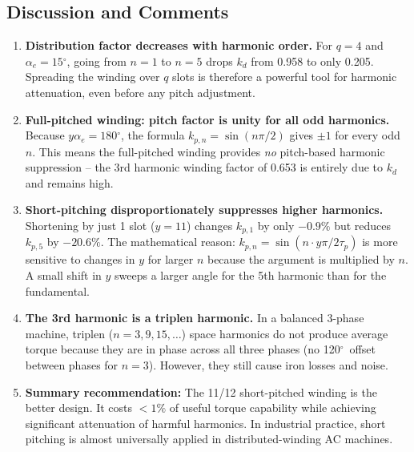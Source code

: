 \documentclass[12pt,a4paper]{article}
\newcommand{\degree}{\ensuremath{^{\circ}}}
\begin{document}
\subsection{Discussion and Comments}

\begin{enumerate}

\item \textbf{Distribution factor decreases with harmonic order.}
  For $q=4$ and $\alpha_e=15\degree$, going from $n=1$ to $n=5$ drops
  $k_d$ from 0.958 to only 0.205.
  Spreading the winding over $q$ slots is therefore a powerful tool for
  harmonic attenuation, even before any pitch adjustment.

\item \textbf{Full-pitched winding: pitch factor is unity for all odd harmonics.}
  Because $y\alpha_e = 180\degree$, the formula $k_{p,n}=\sin(n\pi/2)$
  gives $\pm 1$ for every odd $n$.
  This means the full-pitched winding provides \emph{no} pitch-based harmonic
  suppression -- the 3rd harmonic winding factor of 0.653 is entirely due to
  $k_d$ and remains high.

\item \textbf{Short-pitching disproportionately suppresses higher harmonics.}
  Shortening by just 1 slot ($y = 11$) changes $k_{p,1}$ by only $-0.9\%$
  but reduces $k_{p,5}$ by $-20.6\%$.
  The mathematical reason: $k_{p,n}=\sin(n\cdot y\pi/2\tau_p)$ is more sensitive
  to changes in $y$ for larger $n$ because the argument is multiplied by $n$.
  A small shift in $y$ sweeps a larger angle for the 5th harmonic than for the
  fundamental.

\item \textbf{The 3rd harmonic is a triplen harmonic.}
  In a balanced 3-phase machine, triplen ($n = 3, 9, 15,\ldots$) space
  harmonics do not produce average torque because they are in phase across
  all three phases (no 120\degree\ offset between phases for $n=3$).
  However, they still cause iron losses and noise.


\item \textbf{Summary recommendation:}
  The 11/12 short-pitched winding is the better design.
  It costs $<1\%$ of useful torque capability while achieving significant
  attenuation of harmful harmonics.
  In industrial practice, short pitching is almost universally applied
  in distributed-winding AC machines.

\end{enumerate}
\end{document}
